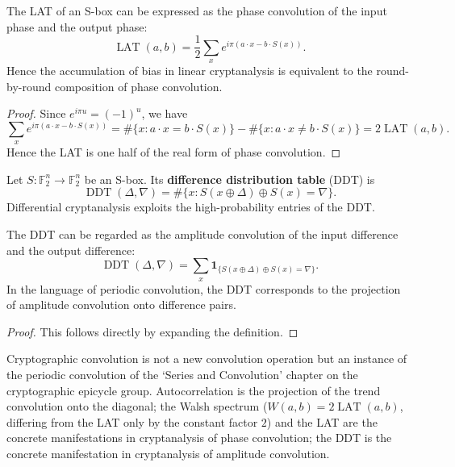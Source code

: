 \begin{proposition}\label{prop:lat_phase_convolution}
The LAT of an S-box can be expressed as the phase convolution of the input phase and the output phase:
\[
\operatorname{LAT}(a,b)=\frac12\sum_x e^{i\pi(a\cdot x-b\cdot S(x))}.
\]
Hence the accumulation of bias in linear cryptanalysis is equivalent to the round-by-round composition of phase convolution.
\end{proposition}

\begin{proof}
Since \(e^{i\pi u}=(-1)^u\), we have
\[
\sum_x e^{i\pi(a\cdot x-b\cdot S(x))}
=\#\{x:a\cdot x=b\cdot S(x)\}-\#\{x:a\cdot x\neq b\cdot S(x)\}
=2\operatorname{LAT}(a,b).
\]
Hence the LAT is one half of the real form of phase convolution.
\end{proof}

\begin{definition}\label{def:ddt}
Let \(S:\mathbb F_2^n\to\mathbb F_2^n\) be an S-box. Its \textbf{difference distribution table} (DDT) is
\[
\operatorname{DDT}(\Delta,\nabla)=\#\{x:S(x\oplus\Delta)\oplus S(x)=\nabla\}.
\]
Differential cryptanalysis exploits the high-probability entries of the DDT.
\end{definition}

\begin{proposition}\label{prop:ddt_amplitude_convolution}
The DDT can be regarded as the amplitude convolution of the input difference and the output difference:
\[
\operatorname{DDT}(\Delta,\nabla)=\sum_x \mathbf 1_{\{S(x\oplus\Delta)\oplus S(x)=\nabla\}}.
\]
In the language of periodic convolution, the DDT corresponds to the projection of amplitude convolution onto difference pairs.
\end{proposition}

\begin{proof}
This follows directly by expanding the definition.
\end{proof}

\begin{remark}\label{rem:crypto_convolution_relation}
Cryptographic convolution is not a new convolution operation but an instance of the periodic convolution of the `Series and Convolution' chapter on the cryptographic epicycle group. Autocorrelation is the projection of the trend convolution onto the diagonal; the Walsh spectrum ($W(a,b)=2\operatorname{LAT}(a,b)$, differing from the LAT only by the constant factor $2$) and the LAT are the concrete manifestations in cryptanalysis of phase convolution; the DDT is the concrete manifestation in cryptanalysis of amplitude convolution.
\end{remark}

